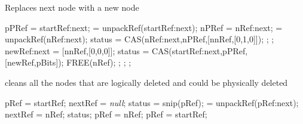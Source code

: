 \documentclass[11pt,onecolumn]{IEEEtran}
\begin{document}
\begin{algorithm}
  \caption{Replaces next node with a new node}
  \label{alg:replace}
  
  \begin{algorithmic}[1]
    \Statex   
      \State pPRef = startRef:next;    
       = unpackRef(startRef:next);
      \If{([pBits] = [0,0,0])}
        \State nPRef = nRef:next;    
         = unpackRef(nRef:next);
          \State status = CAS(nRef:next,nPRef,[nnRef,[0,1,0]]);
            \State
            ;
          \EndIf  
        \Else
          \State
          ;
        \EndIf
        \State newRef:next = [nnRef,[0,0,0]];
        \State status = CAS(startRef:next,pPRef,[newRef,pBits]);
          \State FREE(nRef);
          \State
          ; 
        \Else
          \State
          ;
        \EndIf
      \Else
        \State
        ;
      \EndIf
    \EndFunction
  \end{algorithmic}
\end{algorithm}

\begin{algorithm}
  \caption{cleans all the nodes that are logically deleted and could be physically deleted}
  \label{alg:clean}
  \begin{algorithmic}[1]
    \Statex   
      \State pRef  = startRef;
      \State nextRef  = {\it null};
        \State status = snip(pRef);
         = unpackRef(pRef:next);
          \State nextRef = nRef;
          \State
          \Return status;
            \State pRef = nRef; 
          \Else
              \State
            \Else
              \State pRef = startRef;  
            \EndIf
          \EndIf
        \EndIf
      \EndWhile
    \EndFunction
  \end{algorithmic}
\end{algorithm}
\end{document}
